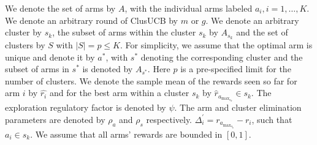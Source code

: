 We denote the set of arms by $A$, with the individual arms labeled $a_i, i=1,\ldots,K$.
We denote an arbitrary round of ClusUCB by $m$ or $g$. We denote an arbitrary cluster by $s_{k}$, the subset of arms within the cluster $s_k$ by  $A_{s_{k}}$  and the set of clusters by $S$ with $|S|=p\leq K$. For simplicity, we assume that the optimal arm is unique and denote it by $a^{*}$, with $s^{*}$ denoting the corresponding cluster and the subset of arms in $s^{*}$ is denoted by $A_{s^{*}}$. Here $p$ is a pre-specified limit for the number of clusters. 
We denote the sample mean of the rewards seen so far for arm $i$ by $\hat{r_i}$ and for the best arm within a cluster $s_k$ by $\hat{r}_{a_{\max_{s_{k}}}}\in s_{k}$. The exploration regulatory factor is denoted by $\psi$. The arm and cluster elimination parameters are denoted by $\rho_{a}$ and $\rho_{s}$ respectively. $\Delta_{i}^{'}=r_{a_{\max_{s_{k}}}} - r_{i}$, such that $a_{i}\in s_{k}$.
We assume that all arms' rewards are bounded in $[0,1]$.


